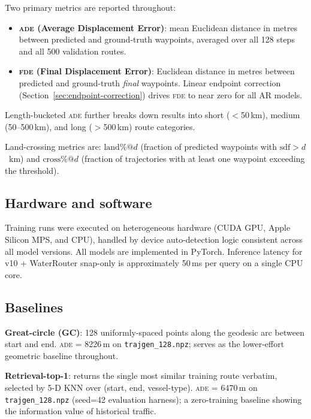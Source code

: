 \documentclass[11pt,a4paper]{article}
\newcommand{\ade}{\textsc{ade}}
\newcommand{\fde}{\textsc{fde}}
\begin{document}
Two primary metrics are reported throughout:
\begin{itemize}
  \item \textbf{\ade{} (Average Displacement Error)}: mean Euclidean distance
    in metres between predicted and ground-truth waypoints, averaged over all
    128 steps and all 500 validation routes.
  \item \textbf{\fde{} (Final Displacement Error)}: Euclidean distance in metres
    between predicted and ground-truth \emph{final} waypoints.
    Linear endpoint correction (Section~\ref{sec:endpoint-correction}) drives
    \fde{} to near zero for all AR models.
\end{itemize}

Length-bucketed \ade{} further breaks down results into short ($<$50\,km),
medium (50--500\,km), and long ($>$500\,km) route categories.

Land-crossing metrics are:
$\text{land\%@}d$ (fraction of predicted waypoints with $\text{sdf} > d$~km)
and $\text{cross\%@}d$ (fraction of trajectories with at least one waypoint
exceeding the threshold).

\subsection{Hardware and software}

Training runs were executed on heterogeneous hardware (CUDA GPU, Apple Silicon MPS,
and CPU), handled by device auto-detection logic consistent across all model versions.
All models are implemented in PyTorch.
Inference latency for v10 + WaterRouter snap-only is approximately
50\,ms per query on a single CPU core.

\subsection{Baselines}

\textbf{Great-circle (GC)}: 128 uniformly-spaced points along the geodesic arc
between start and end.
\ade{} = 8226\,m on \texttt{trajgen\_128.npz}; serves as the lower-effort
geometric baseline throughout.

\textbf{Retrieval-top-1}: returns the single most similar training route verbatim,
selected by 5-D KNN over (start, end, vessel-type).
\ade{} = 6470\,m on \texttt{trajgen\_128.npz} (seed=42 evaluation harness);
a zero-training baseline showing the information value of historical traffic.

\end{document}
